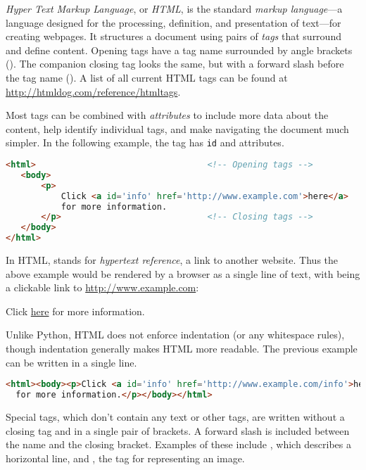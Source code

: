 \emph{Hyper Text Markup Language}, or \emph{HTML}, is the standard \emph{markup language}---a language designed for the processing, definition, and presentation of text---for creating webpages.
It structures a document using pairs of \emph{tags} that surround and define content.
Opening tags have a tag name surrounded by angle brackets ().
The companion closing tag looks the same, but with a forward slash before the tag name ().
A list of all current HTML tags can be found at \url{http://htmldog.com/reference/htmltags}.

Most tags can be combined with \emph{attributes} to include more data about the content, help identify individual tags, and make navigating the document much simpler.
In the following example, the  tag has \lstinline[language=HTML]{id} and  attributes.

\begin{lstlisting}[language=HTML]
<html>                                  <!-- Opening tags -->
   <body>
       <p>
           Click <a id='info' href='http://www.example.com'>here</a>
           for more information.
       </p>                             <!-- Closing tags -->
   </body>
</html>
\end{lstlisting}

In HTML,  stands for \emph{hypertext reference}, a link to another website.
Thus the above example would be rendered by a browser as a single line of text, with  being a clickable link to \url{http://www.example.com}:

\begin{center}
Click \href{http://www.example.com}{here} for more information.
\end{center}

Unlike Python, HTML does not enforce indentation (or any whitespace rules), though indentation generally makes HTML more readable.
The previous example can be written in a single line.

\begin{lstlisting}[language=HTML]
<html><body><p>Click <a id='info' href='http://www.example.com/info'>here</a>
  for more information.</p></body></html>
\end{lstlisting}

Special tags, which don't contain any text or other tags, are written without a closing tag and in a single pair of brackets.
A forward slash is included between the name and the closing bracket.
Examples of these include , which describes a horizontal line, and , the tag for representing an image.

